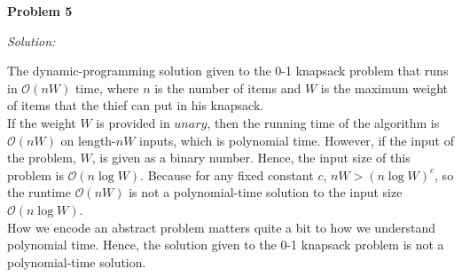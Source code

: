 \documentclass[12pt,letterpaper]{article}
\def\pp{\par\noindent}
\newcommand{\problem}[1]{ \bigskip \pp \textbf{Problem #1}\par}
\newcommand{\solution}{\textit{Solution:}\par}
\begin{document}
\problem{5}
\solution
The dynamic-programming solution given to the 0-1 knapsack problem that runs in $\mathcal{O}(nW)$ time,
where $n$ is the number of items and $W$ is the maximum weight of items that the thief can put in his knapsack. \\
If the weight $W$ is provided in $unary$, then the running time of the algorithm is $\mathcal{O}(nW)$ on length-$nW$ inputs,
which is polynomial time. However, if the input of the problem, $W$, is given as a binary number. Hence, the input size of this problem
is $\mathcal{O}(n \log W)$. Because for any fixed constant $c$, $nW > (n \log W)^{c}$, so the runtime $\mathcal{O}(nW)$
is not a polynomial-time solution to the input size $\mathcal{O}(n \log W)$. \\
How we encode an abstract problem matters quite a bit to how we understand polynomial time. Hence, the solution given to the 0-1 knapsack problem is not a polynomial-time solution.
\end{document}
